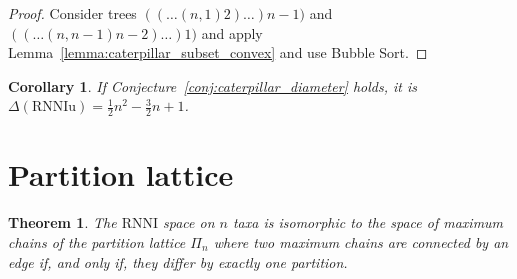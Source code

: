 \documentclass[11pt, a4paper]{article}
\newcommand{\rnni}{\mathrm{RNNI}}
\newcommand{\rnniu}{\mathrm{RNNIu}}
\newtheorem{theorem}[definition]{Theorem}
\newtheorem{corollary}[definition]{Corollary}
\begin{document}

\begin{proof}
	Consider trees $(( \dots (n,1)2)\dots)n-1)$ and $(( \dots (n,n-1)n-2)\dots)1)$ and apply Lemma~\ref{lemma:caterpillar_subset_convex} and use Bubble Sort.
\end{proof}

\begin{corollary}
	If Conjecture~\ref{conj:caterpillar_diameter} holds, it is $\Delta(\rnniu) = \frac{1}{2}n^2-\frac{3}{2}n+1$.
\end{corollary}

\section{Partition lattice}


\begin{theorem}
	The $\rnni$ space on $n$ taxa is isomorphic to the space of maximum chains of the partition lattice $\Pi_n$ where two maximum chains are connected by an edge if, and only if, they differ by exactly one partition.
\end{theorem}



\end{document}
